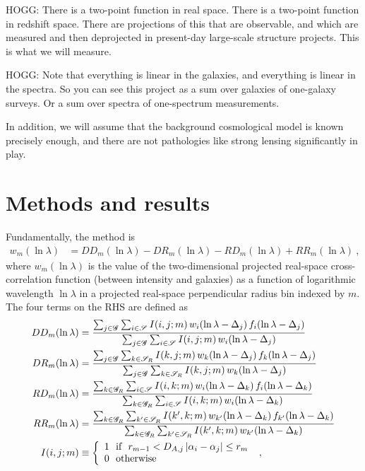 \documentclass{article}
\newcommand{\set}[1]{\mathscr{#1}}
\begin{document}
HOGG: There is a two-point function in real space. There is a two-point function in redshift space. There are projections of this that are observable, and which are measured and then deprojected in present-day large-scale structure projects. This is what we will measure.

HOGG: Note that everything is linear in the galaxies, and everything is linear in the spectra. So you can see this project as a sum over galaxies of one-galaxy surveys. Or a sum over spectra of one-spectrum measurements.

In addition, we will assume that the background cosmological model is known precisely enough, and there are not pathologies like strong lensing significantly in play.

\section{Methods and results}\label{sec:method}
Fundamentally, the method is
\begin{align}
    w_m(\ln\lambda) &= DD_m(\ln\lambda) - DR_m(\ln\lambda) - RD_m(\ln\lambda) + RR_m(\ln\lambda) ~,
\end{align}
where $w_m(\ln\lambda)$ is the value of the two-dimensional projected real-space cross-correlation function (between intensity and galaxies) as a function of logarithmic wavelength $\ln\lambda$ in a projected real-space perpendicular radius bin indexed by $m$.
The four terms on the RHS are defined as
\begin{align}
    DD_m(\ln\lambda) &= \frac{%
    \sum_{j\in\set{G}}\sum_{i\in\set{S}} I(i,j;m)\,w_i(\ln\lambda-\Delta_j)\,f_i(\ln\lambda-\Delta_j)}{%
    \sum_{j\in\set{G}}\sum_{i\in\set{S}} I(i,j;m)\,w_i(\ln\lambda-\Delta_j)} \\
    DR_m(\ln\lambda) &= \frac{%
    \sum_{j\in\set{G}}\sum_{k\in\set{S}_R} I(k,j;m)\,w_k(\ln\lambda-\Delta_j)\,f_k(\ln\lambda-\Delta_j)}{%
    \sum_{j\in\set{G}}\sum_{k\in\set{S}_R} I(k,j;m)\,w_k(\ln\lambda-\Delta_j)} \\
    RD_m(\ln\lambda) &= \frac{%
    \sum_{k\in\set{G}_R}\sum_{i\in\set{S}} I(i,k;m)\,w_i(\ln\lambda-\Delta_k)\,f_i(\ln\lambda-\Delta_k)}{%
    \sum_{k\in\set{G}_R}\sum_{i\in\set{S}} I(i,k;m)\,w_i(\ln\lambda-\Delta_k)} \\
    RR_m(\ln\lambda) &= \frac{%
    \sum_{k\in\set{G}_R}\sum_{k'\in\set{S}_R} I(k',k;m)\,w_{k'}(\ln\lambda-\Delta_k)\,f_{k'}(\ln\lambda-\Delta_k)}{%
    \sum_{k\in\set{G}_R}\sum_{k'\in\set{S}_R} I(k',k;m)\,w_{k'}(\ln\lambda-\Delta_k)} \\
    I(i,j;m) &\equiv\left\{\begin{array}{l}1~~\text{if}~~r_{m-1}<D_{A,j}\,|\alpha_i-\alpha_j|\leq r_m \\ 0~~\text{otherwise}\end{array}\right.~,
\end{align}
\end{document}
